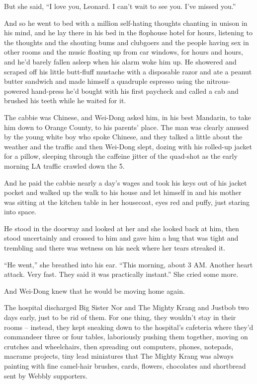 But she said, ``I love you, Leonard. I can't wait to see you. I've
missed you.''

And so he went to bed with a million self-hating thoughts chanting
in unison in his mind, and he lay there in his bed in the flophouse
hotel for hours, listening to the thoughts and the shouting bums
and clubgoers and the people having sex in other rooms and the
music floating up from car windows, for hours and hours, and he'd
barely fallen asleep when his alarm woke him up. He showered and
scraped off his little butt-fluff mustache with a disposable razor
and ate a peanut butter sandwich and made himself a quadruple
espresso using the nitrous-powered hand-press he'd bought with his
first paycheck and called a cab and brushed his teeth while he
waited for it.

The cabbie was Chinese, and Wei-Dong asked him, in his best
Mandarin, to take him down to Orange County, to his parents' place.
The man was clearly amused by the young white boy who spoke
Chinese, and they talked a little about the weather and the traffic
and then Wei-Dong slept, dozing with his rolled-up jacket for a
pillow, sleeping through the caffeine jitter of the quad-shot as
the early morning LA traffic crawled down the 5.

And he paid the cabbie nearly a day's wages and took his keys out
of his jacket pocket and walked up the walk to his house and let
himself in and his mother was sitting at the kitchen table in her
housecoat, eyes red and puffy, just staring into space.

He stood in the doorway and looked at her and she looked back at
him, then stood uncertainly and crossed to him and gave him a hug
that was tight and trembling and there was wetness on his neck
where her tears streaked it.

``He went,'' she breathed into his ear. ``This morning, about 3 AM.
Another heart attack. Very fast. They said it was practically
instant.'' She cried some more.

And Wei-Dong knew that he would be moving home again.

\tb

The hospital discharged Big Sister Nor and The Mighty Krang and
Justbob two days early, just to be rid of them. For one thing, they
wouldn't stay in their rooms -- instead, they kept sneaking down to
the hospital's cafeteria where they'd commandeer three or four
tables, laboriously pushing them together, moving on crutches and
wheelchairs, then spreading out computers, phones, notepads,
macrame projects, tiny lead miniatures that The Mighty Krang was
always painting with fine camel-hair brushes, cards, flowers,
chocolates and shortbread sent by Webbly supporters.

